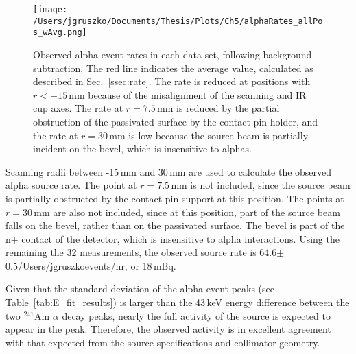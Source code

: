 \begin{figure}[]
 \centering
 \texttt{[image: /Users/jgruszko/Documents/Thesis/Plots/Ch5/alphaRates\_allPos\_wAvg.png]}
 \caption[Observed alpha event rates in each TUBE data set, following background subtraction]{Observed alpha event rates in each data set, following background subtraction. The red line indicates the average value, calculated as described in Sec.~\ref{ssec:rate}. The rate is reduced at positions with $r<-15$\,mm because of the misalignment of the scanning and IR cup axes. The rate at $r=7.5$\,mm is reduced by the partial obstruction of the passivated surface by the contact-pin holder, and the rate at $r=30$\,mm is low because the source beam is partially incident on the bevel, which is insensitive to alphas.} 
 \label{fig:alpha_rate}
\end{figure}

Scanning radii between -15\,mm and 30\,mm are used to calculate the observed alpha source rate. The point at $r = 7.5$\,mm is not included, since the source beam is partially obstructed by the contact-pin support at this position. The points at $r = 30$\,mm are also not included, since at this position, part of the source beam falls on the bevel, rather than on the passivated surface. The bevel is part of the n+ contact of the detector, which is insensitive to alpha interactions. Using the remaining the 32 measurements, the observed source rate is 64.6$\pm$0.5/Users/jgruszkoevents/hr, or 18\,mBq.

Given that the standard deviation of the alpha event peaks (see Table~\ref{tab:E_fit_results}) is larger than the 43\,keV energy difference between the two $^{241}$Am $\alpha$ decay peaks, nearly the full activity of the source is expected to appear in the peak. Therefore, the observed activity is in excellent agreement with that expected from the source specifications and collimator geometry. 
